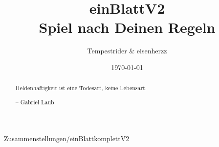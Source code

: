 \documentclass[11pt,a4paper]{scrreprt}
\date{\today}
\author{Tempestrider \& eisenherzz}
\title{\pik \karo einBlattV2\herz \kreuz \\
Spiel nach Deinen Regeln}
\begin{document}
\maketitle

\begin{abstract}
Heldenhaftigkeit ist eine Todesart, keine Lebensart.

-- Gabriel Laub

\end{abstract}




\tableofcontents

 {Zusammenstellungen/einBlattkomplettV2}

\listoftables

%
\end{document}
